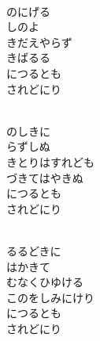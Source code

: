 \documentclass[10pt,b5j]{tarticle} %
\begin{document}
\vspace{1.5em} %
\newcommand{\linespace}{0.5em} %
\newcommand{\blocksize}{0.5\hsize} %
\newcommand{\itemmargin}{3em} %
\begin{enumerate} %
    \setlength{\itemindent}{\itemmargin} %
    \begin{minipage}[c]{\blocksize}
    
        \vspace{\linespace}
        \item~\\
        のにげる\\
        しのよ\\
        きだえやらず\\
        きばるる\\
        につるとも\\
        されどにり
        
    \end{minipage}
    \begin{minipage}[c]{\blocksize}
        
        \vspace{\linespace}
        \item~\\
        のしきに\\
        らずしぬ\\
        きとりはすれども\\
        づきてはやきぬ\\
        につるとも\\
        されどにり
        
    \end{minipage}
    \begin{minipage}[c]{\blocksize}
        
        \vspace{\linespace}
        \item~\\
        るるどきに\\
        はかきて\\
        むなくひゆける\\
        このをしみにけり\\
        につるとも\\
        されどにり
        

\end{minipage}
\end{enumerate}
\end{document}
